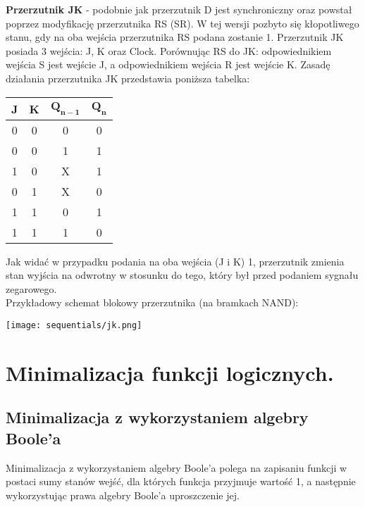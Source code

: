 \documentclass[main.tex]{subfiles}
\begin{document}
    \begin{definition}
        \textbf{Przerzutnik JK} - podobnie jak przerzutnik D jest synchroniczny oraz powstał poprzez modyfikację przerzutnika RS (SR). W tej wersji pozbyto się kłopotliwego stanu, gdy na oba wejścia przerzutnika RS podana zostanie 1.
        Przerzutnik JK posiada 3 wejścia: J, K oraz Clock. Porównując RS do JK: odpowiednikiem wejścia S jest wejście J, a odpowiednikiem wejścia R jest wejście K.
        Zasadę działania przerzutnika JK przedstawia poniższa tabelka:
        \begin{table}[H]
            \center
            \begin{tabular}{|c|c|c|c|}
                \hline
                \textbf{J} & \textbf{K} & $\mathbf{Q_{n-1}}$ & $\mathbf{Q_n}$ \\ \hline
                0 & 0 & 0 & 0              \\ \hline
                0 & 0 & 1 & 1              \\ \hline
                1 & 0 & X & 1              \\ \hline
                0 & 1 & X & 0              \\ \hline
                1 & 1 & 0 & 1              \\ \hline
                1 & 1 & 1 & 0              \\ \hline
            \end{tabular}
        \end{table}
        Jak widać w przypadku podania na oba wejścia (J i K) 1, przerzutnik zmienia stan wyjścia na odwrotny w stosunku do tego, który był przed podaniem sygnału zegarowego. \\
        \noindent Przykładowy schemat blokowy przerzutnika (na bramkach NAND): \\

        \begin{center}
            \texttt{[image: sequentials/jk.png]}
        \end{center}

    \end{definition}

    \newpage

    \section{Minimalizacja funkcji logicznych.}

    \subsection{Minimalizacja z wykorzystaniem algebry Boole'a}
    \begin{definition}
        Minimalizacja z wykorzystaniem algebry Boole'a polega na zapisaniu funkcji w postaci sumy stanów wejść, dla których funkcja przyjmuje wartość 1, a następnie wykorzystując prawa algebry Boole'a uproszczenie jej.
    \end{definition}
\end{document}
